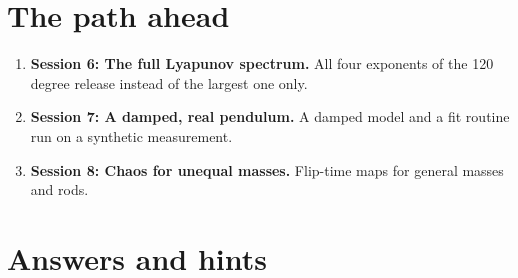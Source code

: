 \documentclass[11pt,a4paper]{article}
\begin{document}
\section{The path ahead}
\begin{enumerate}[nosep]
\item \textbf{Session 6: The full Lyapunov spectrum.} All four exponents of the 120 degree release instead of the largest one only.
\item \textbf{Session 7: A damped, real pendulum.} A damped model and a fit routine run on a synthetic measurement.
\item \textbf{Session 8: Chaos for unequal masses.} Flip-time maps for general masses and rods.
\end{enumerate}

\section{Answers and hints}
\end{document}
